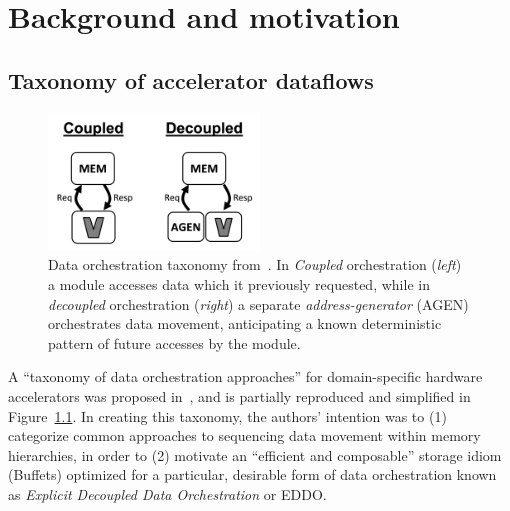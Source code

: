 \chapter{Background and motivation}
\label{chapter:background}

\section{Taxonomy of accelerator dataflows}

\begin{figure}[H]
\centering
\includegraphics[width=0.5\textwidth]{figures/C_D_orchestration.png}
\caption{Data orchestration taxonomy from~\cite{buffet}. In \textit{Coupled} orchestration (\textit{left}) a module accesses data which it previously requested, while in \textit{decoupled} orchestration (\textit{right}) a separate \textit{address-generator} (AGEN) orchestrates data movement, anticipating a known deterministic pattern of future accesses by the module.}
\label{fig:C_D_orchestration}
\end{figure}

A ``taxonomy of data orchestration approaches'' for domain-specific hardware accelerators was proposed in~\cite{buffet}, and is partially reproduced and simplified in Figure~\ref{fig:C_D_orchestration}. In creating this taxonomy, the authors' intention was to (1) categorize common approaches to sequencing data movement within memory hierarchies, in order to (2) motivate an ``efficient and composable'' storage idiom (Buffets\cite{buffet}) optimized for a particular, desirable form of data orchestration known as \textit{Explicit Decoupled Data Orchestration} or EDDO. 

